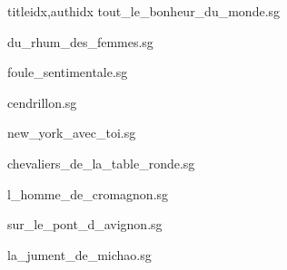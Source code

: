 \documentclass[
    ]{article}
\begin{document}
\begin{songs}{titleidx,authidx}
{tout_le_bonheur_du_monde.sg}


{du_rhum_des_femmes.sg}


{foule_sentimentale.sg}


{cendrillon.sg}


{new_york_avec_toi.sg}


{chevaliers_de_la_table_ronde.sg}


{l_homme_de_cromagnon.sg}


{sur_le_pont_d_avignon.sg}


{la_jument_de_michao.sg}


\end{songs}
\end{document}
